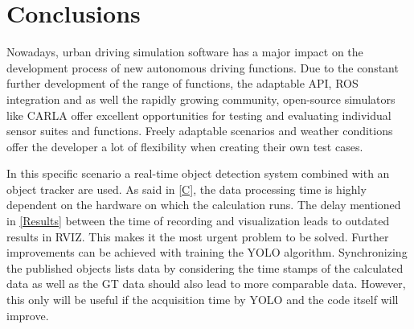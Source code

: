 \section{Conclusions}
	 Nowadays, urban driving simulation software has a major impact on the development process of new autonomous driving functions. Due to the constant further development of the range of functions, the adaptable \ac{API}, \ac{ROS} integration and as well the rapidly growing community, open-source simulators like CARLA offer excellent opportunities for testing and evaluating individual sensor suites and functions. Freely adaptable scenarios and weather conditions offer the developer a lot of flexibility when creating their own test cases.
	 
	 
	 
	 In this specific scenario a real-time object detection system combined with an object tracker are used.
	 As said in \cref{C}, the data processing time is highly dependent on the hardware on which the calculation runs. The delay mentioned in \cref{Results} between the time of recording and visualization leads to outdated results in \ac{RVIZ}. This makes it the most urgent problem to be solved. Further improvements can be achieved with training the \ac{YOLO} algorithm. Synchronizing the published objects lists data by considering the time stamps of the calculated data as well as the \ac{GT} data should also lead to more comparable data. However, this only will be useful if the acquisition time by \ac{YOLO} and the code itself will improve.
	 
	 

	 
	 
	  
	 
	 
	 
	
	 
	 
	
	 
	
	 
	 
	 
	